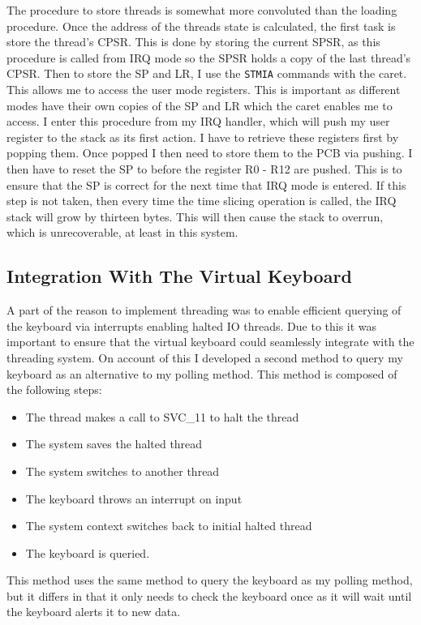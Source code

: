 The procedure to store threads is somewhat more convoluted than the loading procedure. Once the address of the threads state is calculated, the first task is store the thread's CPSR. This is done by storing the current SPSR, as this procedure is called from IRQ mode so the SPSR holds a copy of the last thread's CPSR. Then to store the SP and LR, I use the \verb|STMIA| commands with the caret. This allows me to access the user mode registers. This is important as different modes have their own copies of the SP and LR which the caret enables me to access. I enter this procedure from my IRQ handler, which will push my user register to the stack as its first action. I have to retrieve these registers first by popping them. Once popped I then need to store them to the PCB via pushing. I then have to reset the SP to before the register R0 - R12 are pushed. This is  to ensure that the SP is correct for the next time that IRQ mode is entered. If this step is not taken, then every time the time slicing operation is called, the IRQ stack will grow by thirteen bytes. This will then cause the stack to overrun, which is unrecoverable, at least in this system.


\subsection{Integration With The Virtual Keyboard}
A part of the reason to implement threading was to enable efficient querying of the keyboard via interrupts enabling halted IO threads. Due to this it was important to ensure that the virtual keyboard could seamlessly integrate with the threading system. On account of this I developed a second method to query my keyboard as an alternative to my polling method. This method is composed of the following steps:

\begin{itemize}
	\item The thread makes a call to SVC\_11 to halt the thread
	\item The system saves the halted thread
	\item The system switches to another thread
	\item The keyboard throws an interrupt on input
	\item The system context switches back to initial halted thread
	\item The keyboard is queried.
\end{itemize}
This method uses the same method to query the keyboard as my polling method, but it differs in that it only needs to check the keyboard once as it will wait until the keyboard alerts it to new data. 

